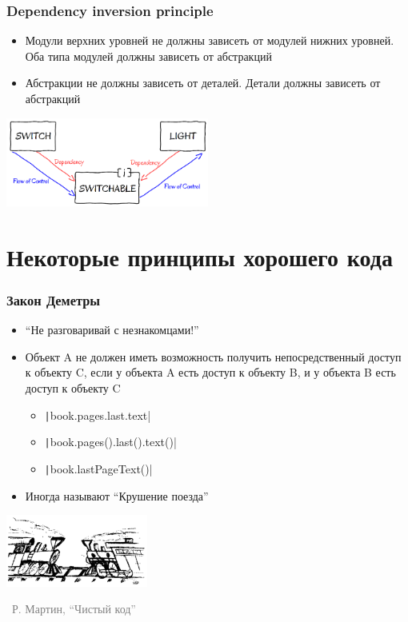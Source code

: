 \documentclass[xetex,mathserif,serif]{beamer}
\newcommand{\attribution}[1] {
	\begin{flushright}\begin{scriptsize}\textcolor{gray}{\textcopyright\, #1}\end{scriptsize}\end{flushright}
}
\begin{document}
	\begin{frame}
		\frametitle{Dependency inversion principle}
		\begin{itemize}
			\item Модули верхних уровней не должны зависеть от модулей нижних уровней. Оба типа модулей должны зависеть от абстракций
			\item Абстракции не должны зависеть от деталей. Детали должны зависеть от абстракций
		\end{itemize}
		\begin{flushright}
			\includegraphics[width=0.5\textwidth]{dependencyInversionPrinciple.png}
		\end{flushright}
	\end{frame}

	\section{Некоторые принципы хорошего кода}

	\begin{frame}
		\frametitle{Закон Деметры}
		\begin{itemize}
			\item ``Не разговаривай с незнакомцами!''
			\item Объект A не должен иметь возможность получить непосредственный доступ к объекту C, если у объекта A есть доступ к объекту B, и у объекта B есть доступ к объекту C
			\begin{itemize}
				\item \texttt|book.pages.last.text|
				\item \texttt|book.pages().last().text()|
				\item \texttt|book.lastPageText()|
			\end{itemize}
			\item Иногда называют ``Крушение поезда''
		\end{itemize}
		\begin{flushright}
			\includegraphics[width=0.35\textwidth]{trains.png}
		\end{flushright}
		\vspace{-0.8cm}
		\attribution{Р. Мартин, ``Чистый код''}
	\end{frame}
\end{document}
